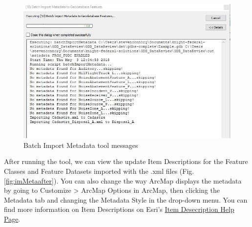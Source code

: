 \documentclass[openany]{book}
\theoremstyle{definition}
\theoremstyle{definition}
\theoremstyle{definition}
\theoremstyle{remark}
\begin{document}
\begin{figure}[H]

{\centering \includegraphics{figures/imMeta-messages} 

}

\caption{Batch Import Metadata tool messages}\label{fig:imMetamessages}
\end{figure}

After running the tool, we can view the update Item Descriptions for the
Feature Classes and Feature Datasets imported with the .xml files (Fig.
\ref{fig:imMetaafter}). You can also change the way ArcMap displays the
metadata by going to Customize \textgreater{} ArcMap Options in ArcMap,
then clicking the Metadata tab and changing the Metadata Style in the
drop-down menu. You can find more information on Item Descriptions on
Esri's
\href{http://desktop.arcgis.com/en/arcmap/latest/map/working-with-arcmap/documenting-items-in-the-catalog-window.htm}{Item
Desecription Help Page}.
\end{document}
